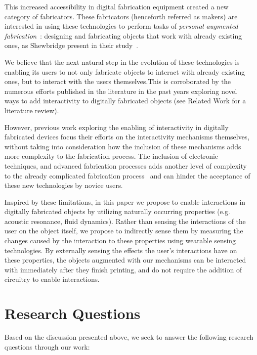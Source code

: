     This increased accessibility in digital fabrication equipment created a new
    category of fabricators. These fabricators (henceforth referred as makers)
    are interested in using these technologies to perform tasks of
    \emph{personal augmented fabrication}~\cite{Ashbrook:2016fga}: designing
    and fabricating objects that work with already existing ones, as Shewbridge
    \etal present in their study~\cite{Shewbridge:2014gl}.

    We believe that the next natural step in the evolution of these
    technologies is enabling its users to not only fabricate objects to
    interact with already existing ones, but to interact with the users
    themselves.This is corroborated by the numerous efforts published in the
    literature in the past years exploring novel ways to add interactivity to
    digitally fabricated objects (see Related Work for a literature review).

    However, previous work exploring the enabling of interactivity in digitally
    fabricated devices focus their efforts on the interactivity mechanisms
    themselves, without taking into consideration how the inclusion of these
    mechanisms adds more complexity to the fabrication process. The inclusion
    of electronic techniques, and advanced fabrication processes adds another
    level of complexity to the already complicated fabrication
    process~\cite{Hudson:2016hi, Mellis:2012ba, Weichel:2014ed} and can hinder
    the acceptance of these new technologies by novice users.

    Inspired by these limitations, in this paper we propose to enable
    interactions in digitally fabricated objects by utilizing naturally
    occurring properties (e.g. acoustic resonance, fluid dynamics). Rather than
    sensing the interactions of the user on the object itself, we propose to
    indirectly sense them by measuring the changes caused by the interaction to
    these properties using wearable sensing technologies. By externally sensing
    the effects the user's interactions have on these properties, the objects
    augmented with our mechanisms can be interacted with immediately after they
    finish printing, and do not require the addition of circuitry to enable
    interactions.

  \section{Research Questions}
    Based on the discussion presented above, we seek to answer the following
    research questions through our work:

